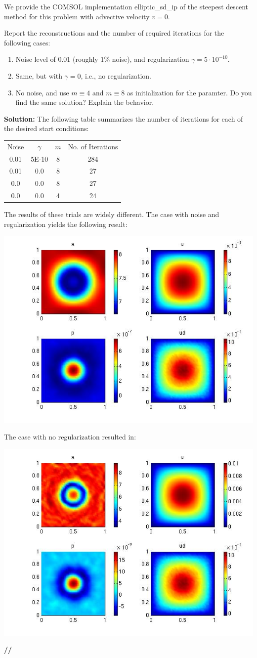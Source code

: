 \documentclass[11pt]{article}
\newenvironment{solution}{\begin{trivlist}\item[]{\bf Solution:}}
                      {\textbf{//} \end{trivlist}}
\begin{document}
We provide the COMSOL implementation elliptic\_sd\_ip of the steepest
descent method for this problem with advective velocity $v = 0$. 
\begin{enumerate}
\item[(a)]Report the reconstructions and the number of required iterations for the following
cases:
\begin{enumerate}
\item[$\bullet$] Noise level of 0.01 (roughly $1\%$ noise), and
	     regularization $\gamma = 5 \cdot 10^{−10}$. 
\item[$\bullet$] Same, but with $\gamma = 0$, i.e., no regularization. 
\item[$\bullet$] No noise, and use $m \equiv 4$ and $m \equiv 8$ as initialization for the paramter. Do
you find the same solution? Explain the behavior. 
\end{enumerate}
\begin{solution}
The following table summarizes the number of iterations for each of the
 desired start conditions: 
\begin{center}
\begin{tabular}{| c | c | c | c |} \cline{1-4}
Noise & $\gamma$ & $m$ & No. of Iterations \\ \cline{1-4}
0.01 & 5E-10 & 8 & 284 \\ \cline{1-4}
0.01 & 0.0 & 8 & 27 \\ \cline{1-4}
0.0 & 0.0 & 8 & 27 \\ \cline{1-4}
0.0 & 0.0 & 4 & 24 \\ \cline{1-4} 
\end{tabular} 
\end{center}
The results of these trials are widely different. The case with noise
 and regularization yields the following result: 
\begin{center}
\includegraphics[width = 6 cm]{figs/prob2aNoiseRegM8.jpg}
\end{center}

The case with no regularization resulted in:
\begin{center}
\includegraphics[width = 6 cm]{figs/prob2aNoiseNoRegM8.jpg}
\end{center}


\end{solution}
\end{enumerate}
\end{document}
